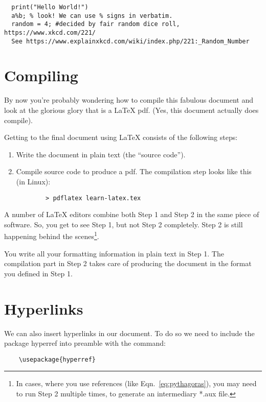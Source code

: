 \documentclass[12pt]{article}
\begin{document}
\begin{verbatim}
  print("Hello World!")
  a%b; % look! We can use % signs in verbatim.
  random = 4; #decided by fair random dice roll, https://www.xkcd.com/221/
  See https://www.explainxkcd.com/wiki/index.php/221:_Random_Number
\end{verbatim}

\section{Compiling}

By now you're probably wondering how to compile this fabulous document
and look at the glorious glory that is a \LaTeX{} pdf.
(Yes, this document actually does compile).

Getting to the final document using \LaTeX{} consists of the following
steps:
  \begin{enumerate}
    \item Write the document in plain text (the ``source code'').
    \item Compile source code to produce a pdf.
     The compilation step looks like this (in Linux): \\
     \begin{verbatim}
        > pdflatex learn-latex.tex
     \end{verbatim}
  \end{enumerate}

A number of \LaTeX{} editors combine both Step 1 and Step 2 in the
same piece of software. So, you get to see Step 1, but not Step 2 completely.
Step 2 is still happening behind the scenes\footnote{In cases, where you use
references (like Eqn.~\ref{eq:pythagoras}), you may need to run Step 2
multiple times, to generate an intermediary *.aux file.}.

You write all your formatting information in plain text in Step 1.
The compilation part in Step 2 takes care of producing the document in the
format you defined in Step 1.

\section{Hyperlinks}
We can also insert hyperlinks in our document. To do so we need to include the
package hyperref into preamble with the command:
\begin{verbatim}
    \usepackage{hyperref}
\end{verbatim}
\end{document}
